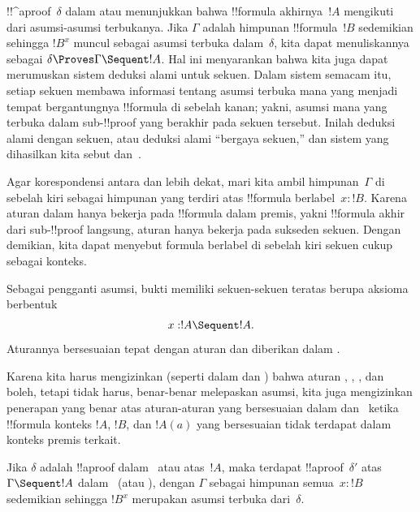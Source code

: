 \documentclass[../../../include/open-logic-section]{subfiles}
\begin{document}


!!^a{proof}~$\delta$ dalam  atau  menunjukkan bahwa
!!{formula} akhirnya~$!A$ mengikuti dari asumsi-asumsi terbukanya. Jika
$\Gamma$ adalah himpunan !!{formula}~$!B$ sedemikian sehingga $!B^x$
muncul sebagai asumsi terbuka dalam~$\delta$, kita dapat menuliskannya
sebagai $\delta \Proves \Gamma \Sequent !A$. Hal ini menyarankan bahwa
kita juga dapat merumuskan sistem deduksi alami untuk sekuen. Dalam
sistem semacam itu, setiap sekuen membawa informasi tentang asumsi terbuka
mana yang menjadi tempat bergantungnya !!{formula} di sebelah kanan;
yakni, asumsi mana yang terbuka dalam sub-!!{proof} yang berakhir pada
sekuen tersebut. Inilah deduksi alami dengan sekuen, atau deduksi alami
``bergaya sekuen,'' dan sistem yang dihasilkan kita sebut
 dan~.

Agar korespondensi antara  dan  lebih dekat, mari kita
ambil himpunan~$\Gamma$ di sebelah kiri sebagai himpunan yang terdiri
atas !!{formula} berlabel~$x:!B$. Karena aturan dalam  hanya
bekerja pada !!{formula} dalam premis, yakni !!{formula} akhir dari
sub-!!{proof} langsung, aturan  hanya bekerja pada sukseden
sekuen. Dengan demikian, kita dapat menyebut formula berlabel di
sebelah kiri sekuen cukup sebagai konteks.

Sebagai pengganti asumsi, bukti  memiliki sekuen-sekuen
teratas berupa aksioma berbentuk
\[x:!A \Sequent !A.\]
Aturannya bersesuaian tepat dengan aturan  dan diberikan dalam
.



Karena kita harus mengizinkan (seperti dalam  dan )
bahwa aturan \Intro{\lif}, \Intro{\lnot}, \Elim{\lor}, dan
\Elim{\lexists} boleh, tetapi tidak harus, benar-benar melepaskan
asumsi, kita juga mengizinkan penerapan yang benar atas aturan-aturan
yang bersesuaian dalam  dan~ ketika
!!{formula} konteks $!A$, $!B$, dan $!A(a)$ yang
bersesuaian tidak terdapat dalam konteks premis terkait.

\begin{prop}
Jika $\delta$ adalah !!a{proof} dalam~ atau 
atas~$!A$, maka terdapat !!a{proof}~$\delta'$ atas
$\Gamma \Sequent !A$ dalam~ (atau ), dengan
$\Gamma$ sebagai himpunan semua~$x:!B$ sedemikian sehingga $!B^x$
merupakan asumsi terbuka dari~$\delta$.
\end{prop}
\end{document}
